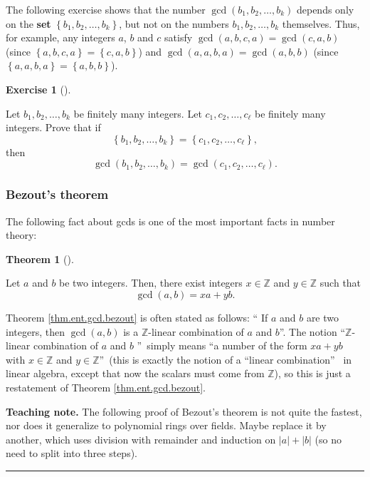\documentclass[numbers=enddot,12pt,final,onecolumn,notitlepage]{scrartcl}%
\newcounter{exer}
\numberwithin{exer}{subsection}
\theoremstyle{definition}
\newtheorem{theo}{Theorem}[subsection]
\newenvironment{theorem}[1][]
{\begin{theo}[#1]\begin{leftbar}}
{\end{leftbar}\end{theo}}
\newtheorem{exmp}[exer]{Exercise}
\newenvironment{exercise}[1][]
{\begin{exmp}[#1]\begin{leftbar}}
{\end{leftbar}\end{exmp}}
\newenvironment{teachingnote}[1][Teaching note]{\noindent\textbf{#1.} }{\ \rule{0.5em}{0.5em}}
\newenvironment{teachingnote}{}{}
\begin{document}
The following exercise shows that the number $\gcd\left(  b_{1},b_{2}%
,\ldots,b_{k}\right)  $ depends only on the \textbf{set} $\left\{  b_{1}%
,b_{2},\ldots,b_{k}\right\}  $, but not on the numbers $b_{1},b_{2}%
,\ldots,b_{k}$ themselves. Thus, for example, any integers $a$, $b$ and $c$
satisfy $\gcd\left(  a,b,c,a\right)  =\gcd\left(  c,a,b\right)  $ (since
$\left\{  a,b,c,a\right\}  =\left\{  c,a,b\right\}  $) and $\gcd\left(
a,a,b,a\right)  =\gcd\left(  a,b,b\right)  $ (since $\left\{  a,a,b,a\right\}
=\left\{  a,b,b\right\}  $).

\begin{exercise}
\label{exe.ent.gcd.set}Let $b_{1},b_{2},\ldots,b_{k}$ be finitely many
integers. Let $c_{1},c_{2},\ldots,c_{\ell}$ be finitely many integers. Prove
that if%
\[
\left\{  b_{1},b_{2},\ldots,b_{k}\right\}  =\left\{  c_{1},c_{2}%
,\ldots,c_{\ell}\right\}  ,
\]
then%
\[
\gcd\left(  b_{1},b_{2},\ldots,b_{k}\right)  =\gcd\left(  c_{1},c_{2}%
,\ldots,c_{\ell}\right)  .
\]

\end{exercise}

\subsubsection{Bezout's theorem}

The following fact about gcds is one of the most important facts in number theory:

\begin{theorem}
\label{thm.ent.gcd.bezout}Let $a$ and $b$ be two integers. Then, there exist
integers $x\in\mathbb{Z}$ and $y\in\mathbb{Z}$ such that%
\[
\gcd\left(  a,b\right)  =xa+yb.
\]

\end{theorem}

Theorem \ref{thm.ent.gcd.bezout} is often stated as follows: \textquotedblleft
If $a$ and $b$ are two integers, then $\gcd\left(  a,b\right)  $ is a
$\mathbb{Z}$-linear combination of $a$ and $b$\textquotedblright. The notion
\textquotedblleft$\mathbb{Z}$-linear combination of $a$ and $b$%
\textquotedblright\ simply means \textquotedblleft a number of the form
$xa+yb$ with $x\in\mathbb{Z}$ and $y\in\mathbb{Z}$\textquotedblright\ (this is
exactly the notion of a \textquotedblleft linear combination\textquotedblright%
\ in linear algebra, except that now the scalars must come from $\mathbb{Z}$),
so this is just a restatement of Theorem \ref{thm.ent.gcd.bezout}.

\begin{teachingnote}
The following proof of Bezout's theorem is not quite the fastest, nor does it
generalize to polynomial rings over fields. Maybe replace it by another, which
uses division with remainder and induction on $\left\vert a\right\vert
+\left\vert b\right\vert $ (so no need to split into three steps).
\end{teachingnote}
\end{document}
